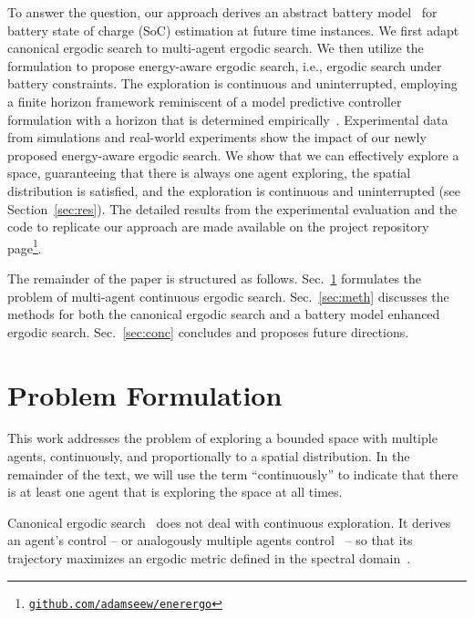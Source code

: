 \documentclass[letterpaper,10pt,conference,twoside]{IEEEtran}
\theoremstyle{definition}
\begin{document}
To answer the question, our approach derives an abstract battery model~\cite{zhao2017observability} for battery state of charge (SoC) estimation at future time instances. We first adapt canonical ergodic search to multi-agent ergodic search. We then utilize the formulation to propose energy-aware ergodic search, i.e., ergodic search under battery constraints. The exploration is continuous and uninterrupted, employing a finite horizon framework reminiscent of a model predictive controller formulation with a horizon that is determined empirically~\cite{seewald2022energy}. Experimental data from simulations and real-world experiments show the impact of our newly proposed energy-aware ergodic search. We show that we can effectively explore a space, guaranteeing that there is always one agent exploring, the spatial distribution is satisfied, and the exploration is continuous and uninterrupted (see Section~\ref{sec:res}). The detailed results from the experimental evaluation and the code to replicate our approach are made available on the project repository page\footnote{\label{reflink}{\tt\footnotesize\href{https://github.com/adamseew/enerergo}{github.com/adamseew/enerergo}}}.

The remainder of the paper is structured as follows. Sec.~\ref{sec:pb} formulates the problem of multi-agent continuous ergodic search. Sec.~\ref{sec:meth} discusses the methods for both the canonical ergodic search and a battery model enhanced ergodic search. Sec.~\ref{sec:conc} concludes and proposes future directions.


\section{Problem Formulation}\label{sec:pb}
\noindent
This work addresses the problem of exploring a bounded space with multiple agents, continuously, and proportionally to a spatial distribution. 
%
In the remainder of the text, we will use the term ``continuously'' to indicate that there is at least one agent that is exploring the space at all times.

Canonical ergodic search~\cite{mathew2011metrics,miller2013trajectory,abraham2021ergodic,miller2016ergodic,dressel2018optimality,torre2016ergodic,shetty2022ergodic} does not deal with continuous exploration. It derives an agent's control -- or analogously multiple agents control~\cite{prabhakar2020ergodic,coffin2022multi,lerch2023safety,abraham2018decentralized,patel2021multi} -- so that its trajectory maximizes an ergodic metric defined in the spectral domain~\cite{calinon2020mixture}.
\end{document}
